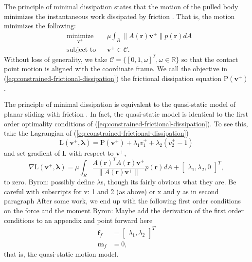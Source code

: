 \documentclass[conference]{IEEEtran}
\newcommand{\BB}[1]{{\color{red} {Byron: {#1}}}}
\begin{document}
The principle of minimal dissipation states that the motion of the
pulled body minimizes the instantaneous work dissipated by friction
\cite{alexander1993bounds}. That is, the motion minimizes the
following: 
\begin{equation}
\begin{aligned}
& \underset{\mathbf{v}^+}{\text{minimize}}
& & \mu\int_R\lVert A(\mathbf{r})\mathbf{v}^+ \rVert p(\mathbf{r}) dA \\
& \text{subject to}
& & \mathbf{v}^+ \in \mathcal{C}.
\end{aligned} \label{eq:constrained-frictional-dissipation}
\end{equation}
Without loss of generality, we take
$\mathcal{C} = \{[0,1,\omega]^T, \omega \in \mathbb{R}\}$ so that the
contact point motion is aligned with the coordinate frame. We call the
objective in (\ref{eq:constrained-frictional-dissipation}) the
frictional dissipation equation $\mathrm{P}(\mathbf{v}^+)$.

The principle of minimal dissipation is equivalent to the quasi-static
model of planar sliding with friction \cite{alexander1993bounds}.  In
fact, the quasi-static model is identical to the first order
optimality conditions of
(\ref{eq:constrained-frictional-dissipation}). To see this, take the
Lagrangian of (\ref{eq:constrained-frictional-dissipation})
\begin{equation}
  \mathrm{L}(\mathbf{v}^+,\mathbf{\lambda}) = \mathrm{P}(\mathbf{v}^+) + \lambda_1v^+_1 + \lambda_2(v^+_2-1)
\end{equation}
and set gradient of $\mathrm{L}$ with respect to $\mathbf{v}^+$,
\begin{equation}
  \nabla\mathrm{L}(\mathbf{v}^+,\mathbf{\lambda}) = \mu\int_R\frac{A(\mathbf{r})^TA(\mathbf{r})\mathbf{v}^+}{\lVert A(\mathbf{r})\mathbf{v}^+ \rVert} p(\mathbf{r}) dA + \begin{bmatrix}\lambda_1, \lambda_2, 0\end{bmatrix}^T,
\end{equation}
to zero. \BB{possibly define $\lambda$s, though its fairly obvious what they are. Be careful with subscripts for v: 1 and 2 (as above) or x and y as in second paragraph} After some work, we end up with the following first order
conditions on the force and the moment \BB{Maybe add the derivation of the first order conditions to an appendix and point forward here}
\begin{align}
  \mathbf{f}_f &= \begin{bmatrix}\lambda_1, \lambda_2\end{bmatrix}^T\\
  \mathbf{m}_f &= 0,
\end{align}
that is, the quasi-static motion model.
\end{document}
